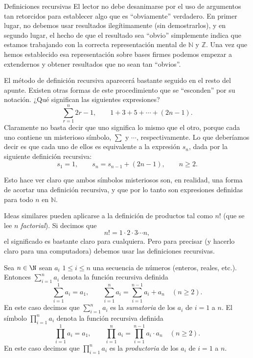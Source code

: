 \begin{section}{Definiciones recursivas}
El lector no debe desanimarse por el uso de argumentos tan retorcidos para establecer algo que es ``obviamente'' verdadero. En primer lugar, no debemos usar resultados ilegítimamente (sin demostrarlos), y en segundo lugar, el hecho de que el resultado sea ``obvio'' simplemente indica que estamos trabajando con la correcta representación mental de $\mathbb N$ y $\mathbb Z$. Una vez que hemos establecido esa representación sobre bases firmes podemos empezar a extendernos y obtener resultados que no sean tan ``obvios''.

El método de definición recursiva aparecerá bastante seguido en el resto del apunte. Existen otras formas de este procedimiento que se ``esconden'' por su notación. ¿Qué significan las siguientes expresiones?
$$
\sum_{r=1}^{n} 2r-1,\qquad 1+3+5+\cdots +(2n-1).
$$
Claramente no basta decir que uno significa lo mismo que el otro, porque cada uno contiene un misterioso símbolo, $\sum$ y $\cdots$, respectivamente. Lo que deberíamos decir es que cada uno de ellos es equivalente a la expresión $s_n$, dada por la siguiente definición recursiva:
$$
s_1= 1, \qquad s_n = s_{n-1} +(2n-1), \qquad n\ge 2.
$$

Esto hace ver claro que ambos símbolos misteriosos son, en realidad, una forma de acortar una definición recursiva, y que por lo tanto son expresiones definidas para todo $n$ en $\mathbb N$.

Ideas similares pueden aplicarse a la definición de productos tal como $n!$ (que se lee $n$ \textit{factorial}). Si decimos que
$$
n!=1 \cdot 2 \cdot 3 \cdots n,
$$
el significado es bastante claro para cualquiera. Pero para precisar (y hacerlo claro para una computadora) debemos usar las definiciones recursivas.

\begin{definicion} Sea $n \in \N$ sean $a_i$  $1 \le i \le n$ una secuencia de números (enteros, reales, etc.). Entonces $\sum_{i=1}^{n} a_i$  denota la función recursiva definida  
    $$
    \sum_{i=1}^{1} a_i= a_1, \qquad \sum_{i=1}^{n} a_i = \sum_{i=1}^{n-1} a_i+ a_{n} \quad (n\ge 2).
    $$
    En  este caso  decimos que  $\sum_{i=1}^{n} a_i$ es la \textit{sumatoria} de los $a_i$ de $i=1$  a $n$. El símbolo $\prod_{i=1}^{n} a_i$ denota la función recursiva definida  
    $$
    \prod_{i=1}^{1} a_i= a_1, \qquad \prod_{i=1}^{n} a_i = \prod_{i=1}^{n-1} a_i \cdot  a_{n} \quad (n\ge 2).
    $$
    En  este caso  decimos que  $\prod_{i=1}^{n} a_i$ es la \textit{productoria} de los $a_i$ de $i=1$  a $n$. 
\end{definicion}




\end{section}
